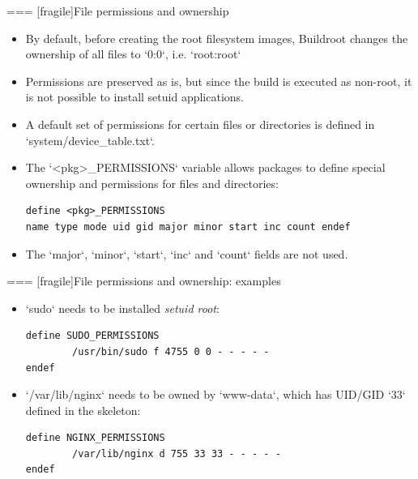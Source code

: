 === [fragile]{File permissions and ownership}

\begin{itemize}

\item By default, before creating the root filesystem images,
  Buildroot changes the ownership of all files to `0:0`, i.e.
  `root:root`
\item Permissions are preserved as is, but since the build is executed
  as non-root, it is not possible to install setuid applications.
\item A default set of permissions for certain files or directories is
  defined in `system/device_table.txt`.
\item The `<pkg>_PERMISSIONS` variable allows packages to define
  special ownership and permissions for files and directories:
{\small
  \begin{block}{}
\begin{verbatim}
define <pkg>_PERMISSIONS
name type mode uid gid major minor start inc count endef
\end{verbatim}
  \end{block}}
\item The `major`, `minor`, `start`, `inc` and
  `count` fields are not used.

\end{itemize}



=== [fragile]{File permissions and ownership: examples}

  \begin{itemize}
  \item `sudo` needs to be installed {\em setuid root}:
  \begin{block}{}
    \begin{verbatim}
define SUDO_PERMISSIONS
        /usr/bin/sudo f 4755 0 0 - - - - -
endef
\end{verbatim}
\end{block}

\item `/var/lib/nginx` needs to be owned by `www-data`,
  which has UID/GID `33` defined in the skeleton:

\begin{block}{}
  \begin{verbatim}
define NGINX_PERMISSIONS
        /var/lib/nginx d 755 33 33 - - - - -
endef
\end{verbatim}
\end{block}

\end{itemize}



